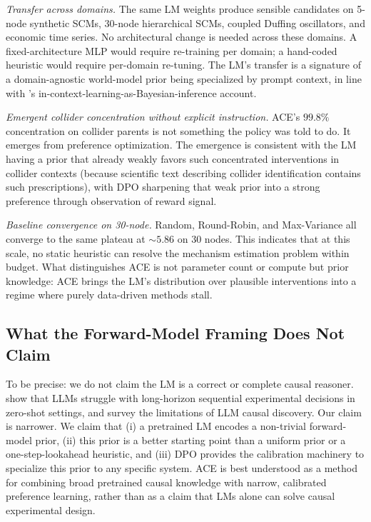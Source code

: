 \emph{Transfer across domains.} The same LM weights produce sensible candidates on 5-node synthetic SCMs, 30-node hierarchical SCMs, coupled Duffing oscillators, and economic time series. No architectural change is needed across these domains. A fixed-architecture MLP would require re-training per domain; a hand-coded heuristic would require per-domain re-tuning. The LM's transfer is a signature of a domain-agnostic world-model prior being specialized by prompt context, in line with \citet{xie2022explanation}'s in-context-learning-as-Bayesian-inference account.

\emph{Emergent collider concentration without explicit instruction.} ACE's $99.8\%$ concentration on collider parents is not something the policy was told to do. It emerges from preference optimization. The emergence is consistent with the LM having a prior that already weakly favors such concentrated interventions in collider contexts (because scientific text describing collider identification contains such prescriptions), with DPO sharpening that weak prior into a strong preference through observation of reward signal.

\emph{Baseline convergence on 30-node.} Random, Round-Robin, and Max-Variance all converge to the same plateau at $\sim\!5.86$ on 30 nodes. This indicates that at this scale, no static heuristic can resolve the mechanism estimation problem within budget. What distinguishes ACE is not parameter count or compute but prior knowledge: ACE brings the LM's distribution over plausible interventions into a regime where purely data-driven methods stall.

\subsection{What the Forward-Model Framing Does Not Claim}

To be precise: we do not claim the LM is a correct or complete causal reasoner. \citet{boxinggym2025,autobench2025} show that LLMs struggle with long-horizon sequential experimental decisions in zero-shot settings, and \citet{llm_science_survey2025} survey the limitations of LLM causal discovery. Our claim is narrower. We claim that (i) a pretrained LM encodes a non-trivial forward-model prior, (ii) this prior is a better starting point than a uniform prior or a one-step-lookahead heuristic, and (iii) DPO provides the calibration machinery to specialize this prior to any specific system. ACE is best understood as a method for combining broad pretrained causal knowledge with narrow, calibrated preference learning, rather than as a claim that LMs alone can solve causal experimental design.

